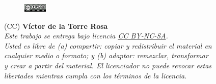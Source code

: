
\vspace{5cm}

\begin{flushright}

\begin{figure}
\includegraphics[width=0.10\textwidth,right]{figs/by-nc-sa.png}
\end{figure}

\vspace{0.2cm}

{\tiny 
(CC) \textbf{Víctor de la Torre Rosa}\\ %
\vspace{0.5cm}
\emph{
Este trabajo se entrega bajo licencia \href{https://creativecommons.org/licenses/by-nc-sa/3.0/es/}{CC BY-NC-SA}. \\
Usted es libre de \textit{(a) compartir}: copiar y redistribuir el material en \\
cualquier medio o formato; y \textit{(b) adaptar}: remezclar, transformar \\
y crear a partir del material. El licenciador no puede revocar estas \\
libertades mientras cumpla con los términos de la licencia. \\}
}

\end{flushright}

